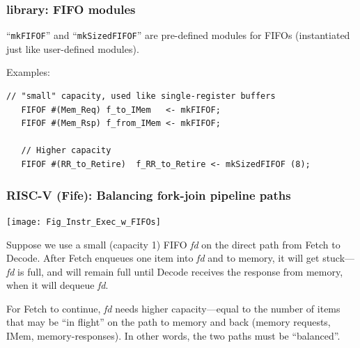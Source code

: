 \begin{frame}[fragile]
\frametitle{{\BSV} library: FIFO modules}

\footnotesize

``{\tt mkFIFOF}'' and ``{\tt mkSizedFIFOF}'' are pre-defined {\BSV} modules for FIFOs
(instantiated just like user-defined modules).

Examples:

\begin{Verbatim}[frame=single]
   // "small" capacity, used like single-register buffers
   FIFOF #(Mem_Req) f_to_IMem   <- mkFIFOF;
   FIFOF #(Mem_Rsp) f_from_IMem <- mkFIFOF;

   // Higher capacity
   FIFOF #(RR_to_Retire)  f_RR_to_Retire <- mkSizedFIFOF (8);
\end{Verbatim}

\end{frame}


\begin{frame}[fragile]
\frametitle{{\bf RISC-V} (Fife): Balancing fork-join pipeline paths}

\footnotesize

\begin{center}
\texttt{[image: Fig\_Instr\_Exec\_w\_FIFOs]}
\end{center}

Suppose we use a small (capacity 1) FIFO \emph{fd} on the direct path
from Fetch to Decode. After Fetch enqueues one item into \emph{fd}
and to memory, it will get stuck---\emph{fd} is full, and will remain
full until Decode receives the response from memory, when it will
dequeue \emph{fd}.

\vspace{1ex}

For Fetch to continue, \emph{fd} needs higher capacity---equal to the
number of items that may be ``in flight'' on the path to memory and
back (memory requests, IMem, memory-responses).  In other words, the
two paths must be ``balanced''.

\end{frame}


